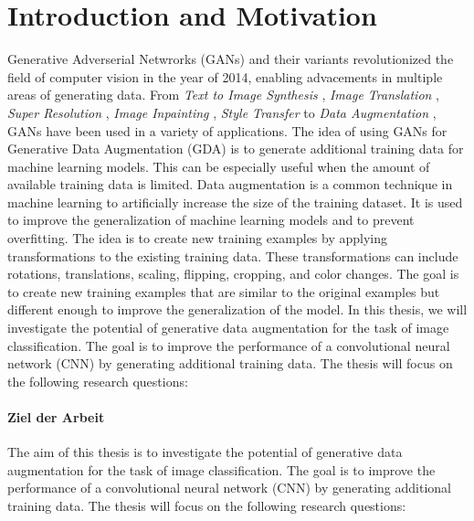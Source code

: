\section{Introduction and Motivation}\label{introduction_and_motivation}
\pagestyle{fancy}
Generative Adverserial Netwrorks (GANs) \cite{goodfellow2014generativeadversarialnetworks} and their variants revolutionized the field of computer vision in the year of 2014, enabling advacements in multiple areas of generating data. From \textit{Text to Image Synthesis} \cite{reed2016generativeadversarialtextimage}, \textit{Image Translation} \cite{isola2018imagetoimagetranslationconditionaladversarial}, \textit{Super Resolution} \cite{ledig2017photorealisticsingleimagesuperresolution}, \textit{Image Inpainting} \cite{pathak2016contextencodersfeaturelearning}, \textit{Style Transfer} \cite{wang2023multimodalityguidedimagestyletransfer} to \textit{Data Augmentation} \cite{shorten2019survey}, GANs have been used in a variety of applications. The idea of using GANs for Generative Data Augmentation (GDA) is to generate additional training data for machine learning models. This can be especially useful when the amount of available training data is limited. Data augmentation is a common technique in machine learning to artificially increase the size of the training dataset. It is used to improve the generalization of machine learning models and to prevent overfitting. The idea is to create new training examples by applying transformations to the existing training data. These transformations can include rotations, translations, scaling, flipping, cropping, and color changes. The goal is to create new training examples that are similar to the original examples but different enough to improve the generalization of the model. In this thesis, we will investigate the potential of generative data augmentation for the task of image classification. The goal is to improve the performance of a convolutional neural network (CNN) by generating additional training data. The thesis will focus on the following research questions:

\paragraph{Ziel der Arbeit}\label{ziel_der_arbeit}
The aim of this thesis is to investigate the potential of generative data augmentation for the task of image classification. The goal is to improve the performance of a convolutional neural network (CNN) by generating additional training data. The thesis will focus on the following research questions:


\newpage
